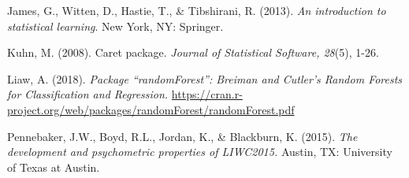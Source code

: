 \documentclass[,acmart]{apa6}
\begin{document}
James, G., Witten, D., Hastie, T., \& Tibshirani, R. (2013). \emph{An
introduction to statistical learning}. New York, NY: Springer.

Kuhn, M. (2008). Caret package. \emph{Journal of Statistical Software,
28}(5), 1-26.

Liaw, A. (2018). \emph{Package \enquote{randomForest}: Breiman and
Cutler's Random Forests for Classification and Regression.}
\url{https://cran.r-project.org/web/packages/randomForest/randomForest.pdf}

Pennebaker, J.W., Boyd, R.L., Jordan, K., \& Blackburn, K. (2015).
\emph{The development and psychometric properties of LIWC2015.} Austin,
TX: University of Texas at Austin.

\hypertarget{refs}{}

\endgroup
\end{document}
